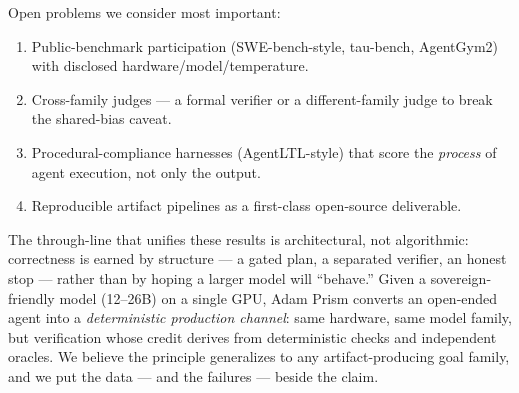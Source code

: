 \documentclass[11pt]{article}
\begin{document}
Open problems we consider most important:
\begin{enumerate}
  \item Public-benchmark participation (SWE-bench-style, tau-bench, AgentGym2) with
        disclosed hardware/model/temperature.
  \item Cross-family judges --- a formal verifier or a different-family judge to break the
        shared-bias caveat.
  \item Procedural-compliance harnesses (AgentLTL-style) that score the \emph{process} of
        agent execution, not only the output.
  \item Reproducible artifact pipelines as a first-class open-source deliverable.
\end{enumerate}

The through-line that unifies these results is architectural, not algorithmic: correctness
is earned by structure --- a gated plan, a separated verifier, an honest stop --- rather
than by hoping a larger model will ``behave.'' Given a sovereign-friendly model (12--26B)
on a single GPU, Adam Prism converts an open-ended agent into a \emph{deterministic
production channel}: same hardware, same model family, but verification whose credit
derives from deterministic checks and independent oracles. We believe the principle
generalizes to any artifact-producing goal family, and we put the data --- and the failures
--- beside the claim.
\end{document}
